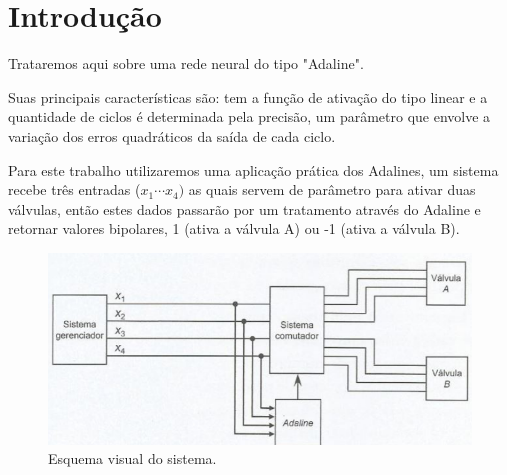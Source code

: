 \section{Introdução}
Trataremos aqui sobre uma rede neural do tipo "Adaline".

Suas principais características são: tem a função de ativação do tipo linear e a quantidade de ciclos é determinada pela precisão, um parâmetro que envolve a variação dos erros quadráticos da saída de cada ciclo.

Para este trabalho utilizaremos uma aplicação prática dos Adalines, um sistema recebe três entradas ($x_{1} \cdots x_4)$ as quais servem de parâmetro para ativar duas válvulas, então estes dados passarão por um tratamento através do Adaline e retornar valores bipolares, 1 (ativa a válvula A) ou -1 (ativa a válvula B).

\begin{figure}[H]
	\centering
	\includegraphics[scale = 0.6]{imagens/visual}
	\caption{Esquema visual do sistema.}
\end{figure}